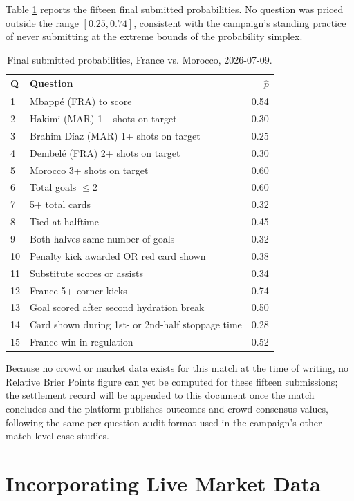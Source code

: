 \documentclass[11pt]{article}
\begin{document}
Table \ref{tab:finalprices} reports the fifteen final submitted probabilities. No question
was priced outside the range $[0.25, 0.74]$, consistent with the campaign's standing
practice of never submitting at the extreme bounds of the probability simplex.

\begin{table}[H]
\centering
\caption{Final submitted probabilities, France vs. Morocco, 2026-07-09.}
\label{tab:finalprices}
\begin{tabular}{p{0.6cm}p{9.6cm}r}
\toprule
Q & Question & $\hat p$ \\
\midrule
1 & Mbapp\'e (FRA) to score & 0.54 \\
2 & Hakimi (MAR) 1+ shots on target & 0.30 \\
3 & Brahim D\'iaz (MAR) 1+ shots on target & 0.25 \\
4 & Dembel\'e (FRA) 2+ shots on target & 0.30 \\
5 & Morocco 3+ shots on target & 0.60 \\
6 & Total goals $\le 2$ & 0.60 \\
7 & 5+ total cards & 0.32 \\
8 & Tied at halftime & 0.45 \\
9 & Both halves same number of goals & 0.32 \\
10 & Penalty kick awarded OR red card shown & 0.38 \\
11 & Substitute scores or assists & 0.34 \\
12 & France 5+ corner kicks & 0.74 \\
13 & Goal scored after second hydration break & 0.50 \\
14 & Card shown during 1st- or 2nd-half stoppage time & 0.28 \\
15 & France win in regulation & 0.52 \\
\bottomrule
\end{tabular}
\end{table}

Because no crowd or market data exists for this match at the time of writing, no
Relative Brier Points figure can yet be computed for these fifteen submissions; the
settlement record will be appended to this document once the match concludes and the
platform publishes outcomes and crowd consensus values, following the same
per-question audit format used in the campaign's other match-level case studies.

\section{Incorporating Live Market Data}
\label{sec:marketrevision}
\end{document}
